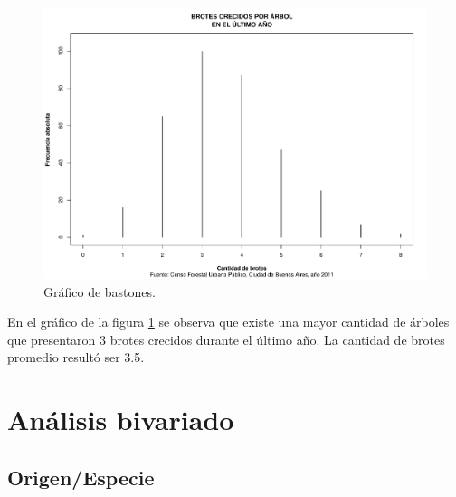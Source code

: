 \documentclass[11pt]{article}
\begin{document}
\begin{figure}[h!]
  \begin{center}
    \includegraphics[width=\linewidth]{bastonesBrotes.pdf}
    \caption{Gráfico de bastones.}
    \label{fig:bastonesBrotes}
  \end{center}  
\end{figure}

\begin{justify}
  En el gráfico de la figura \ref{fig:bastonesBrotes} se observa que
  existe una mayor cantidad de árboles que presentaron 3 brotes crecidos
  durante el último año. La cantidad de brotes promedio resultó ser 3.5.
\end{justify}


\newpage
\section{Análisis bivariado}
\subsection{Origen/Especie}
\end{document}
